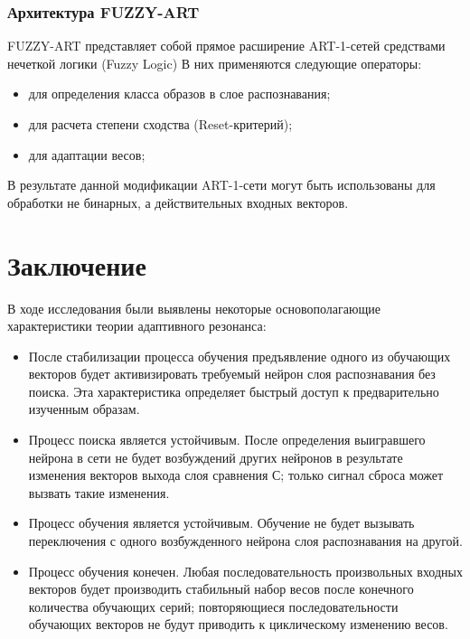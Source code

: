 \documentclass[14pt,a4paper,report]{article}
\begin{document}
\subsubsection{Архитектура FUZZY-ART}

FUZZY-ART представляет собой прямое расширение ART-1-сетей средствами нечеткой логики (Fuzzy Logic) \cite{cite-window-adapt} В них применяются следующие операторы:

\begin{itemize}
	\item для определения класса образов в слое распознавания;
	\item для расчета степени сходства (Reset-критерий);
	\item для адаптации весов;
\end{itemize}	

В результате данной модификации ART-1-сети могут быть использованы для обработки не бинарных, а действительных входных векторов.

\section{Заключение}

В ходе исследования были выявлены некоторые основополагающие характеристики теории адаптивного резонанса:

\begin{itemize}
	\item После стабилизации процесса обучения предъявление одного из обучающих векторов будет активизировать требуемый нейрон слоя распознавания без поиска. Эта характеристика  определяет быстрый доступ к предварительно изученным образам.
	\item Процесс поиска является устойчивым. После определения выигравшего нейрона в сети не будет возбуждений других нейронов в результате изменения векторов выхода слоя сравнения С; только сигнал сброса может вызвать такие изменения.
	\item Процесс обучения является устойчивым. Обучение не будет вызывать переключения с одного возбужденного нейрона слоя распознавания на другой.
	\item Процесс обучения конечен. Любая последовательность произвольных входных векторов будет производить стабильный набор весов после конечного количества обучающих серий; повторяющиеся последовательности обучающих векторов не будут приводить к циклическому изменению весов.
\end{itemize}
\end{document}
